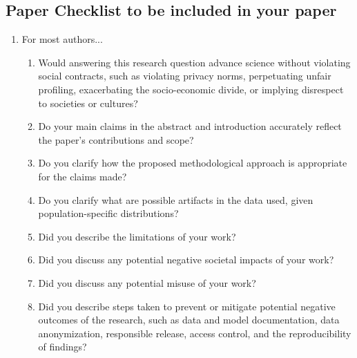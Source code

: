 \documentclass[letterpaper]{article} %
\begin{document}

\subsection{Paper Checklist to be included in your paper}
\begin{enumerate}

\item For most authors...
\begin{enumerate}
    \item Would answering this research question advance science without violating social contracts, such as violating privacy norms, perpetuating unfair profiling, exacerbating the socio-economic divide, or implying disrespect to societies or cultures?
    

  \item Do your main claims in the abstract and introduction accurately reflect the paper's contributions and scope?
    

  \item Do you clarify how the proposed methodological approach is appropriate for the claims made?
    

  \item Do you clarify what are possible artifacts in the data used, given population-specific distributions?
    

  \item Did you describe the limitations of your work?
    

  \item Did you discuss any potential negative societal impacts of your work?
    

  \item Did you discuss any potential misuse of your work?
    

  \item Did you describe steps taken to prevent or mitigate potential negative outcomes of the research, such as data and model documentation, data anonymization, responsible release, access control, and the reproducibility of findings?
    


\end{enumerate}
\end{enumerate}
\end{document}
